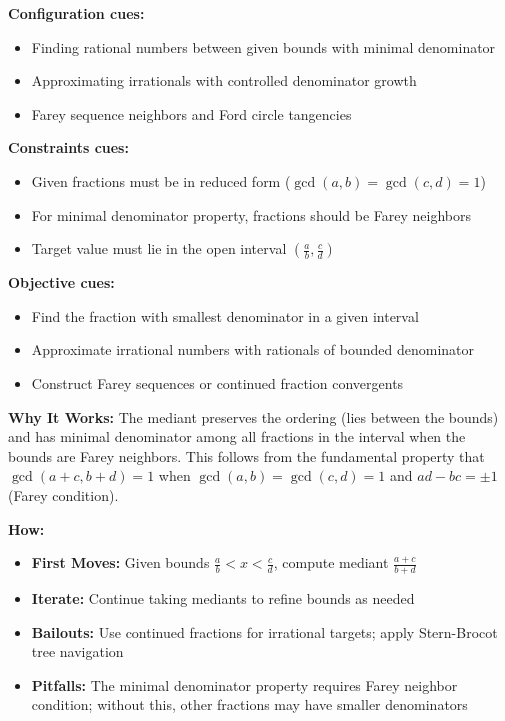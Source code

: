 \documentclass[12pt]{article}
\begin{document}
\textbf{Configuration cues:}
\begin{itemize}
    \item Finding rational numbers between given bounds with minimal denominator
    \item Approximating irrationals with controlled denominator growth
    \item Farey sequence neighbors and Ford circle tangencies
\end{itemize}

\textbf{Constraints cues:}
\begin{itemize}
    \item Given fractions must be in reduced form ($\gcd(a,b)=\gcd(c,d)=1$)
    \item For minimal denominator property, fractions should be Farey neighbors
    \item Target value must lie in the open interval $(\frac{a}{b}, \frac{c}{d})$
\end{itemize}

\textbf{Objective cues:}
\begin{itemize}
    \item Find the fraction with smallest denominator in a given interval
    \item Approximate irrational numbers with rationals of bounded denominator
    \item Construct Farey sequences or continued fraction convergents
\end{itemize}

\textbf{Why It Works:} The mediant preserves the ordering (lies between the bounds) and has minimal denominator among all fractions in the interval when the bounds are Farey neighbors. This follows from the fundamental property that $\gcd(a+c, b+d) = 1$ when $\gcd(a,b) = \gcd(c,d) = 1$ and $ad - bc = \pm 1$ (Farey condition).

\textbf{How:}
\begin{itemize}
    \item \textbf{First Moves:} Given bounds $\frac{a}{b} < x < \frac{c}{d}$, compute mediant $\frac{a+c}{b+d}$
    \item \textbf{Iterate:} Continue taking mediants to refine bounds as needed
    \item \textbf{Bailouts:} Use continued fractions for irrational targets; apply Stern-Brocot tree navigation
    \item \textbf{Pitfalls:} The minimal denominator property requires Farey neighbor condition; without this, other fractions may have smaller denominators
\end{itemize}
\end{document}
